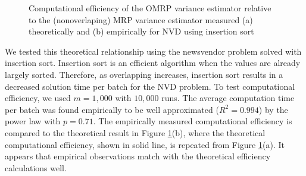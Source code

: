 \documentclass[12pt]{article}
\begin{document}
\begin{figure}[thb!]
	\centering
		\caption{
		Computational efficiency of the OMRP variance estimator relative to the (nonoverlaping) MRP variance estimator measured
		(a) theoretically and
		(b) empirically for NVD using insertion sort
		}
\label{fig:efficiency}
\end{figure}


We tested this theoretical relationship using the newsvendor problem solved with insertion sort.
Insertion sort is an efficient algorithm when the values are already largely sorted. 
Therefore, as overlapping increases, insertion sort results in a decreased solution time per batch for the NVD problem. 
To test computational efficiency, we used $m = 1,000$ with $10,000$ runs.
The average computation time per batch was found empirically to be well approximated ($R^2 = 0.994$) by the power law with $p = 0.71$.
The empirically measured computational efficiency is compared to the theoretical result in Figure \ref{fig:efficiency}(b), where the theoretical computational efficiency, shown in solid line, is repeated from Figure \ref{fig:efficiency}(a).
It appears that empirical observations match with the theoretical efficiency calculations well. 
\end{document}
